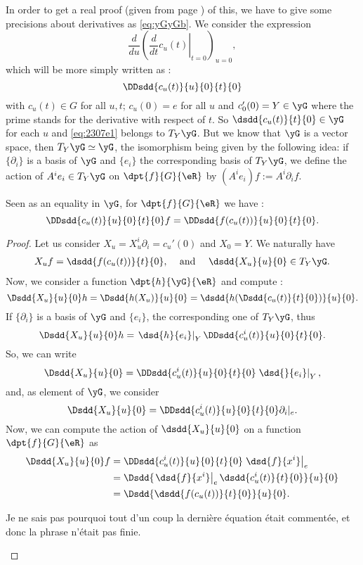 In order to get a real proof (given from page \pageref{pg_demXY_YX}) of this, we have to give some precisions about derivatives as \eqref{eq:yGyGb}. We consider the expression
\[
  \frac{d}{du}\left( \left.\frac{d}{dt} c_u(t)\right|_{t=0}\right)_{u=0},
\]
which will be more simply written as :
\begin{equation}\label{eq:2307e1}
\DDsdd{ c_u(t) }{u}{0}{t}{0}
\end{equation}
with $c_u(t)\in G$ for all $u,t$; $c_u(0)=e$ for all $u$ and $c_0'(0)=Y\in\yG$ where the prime stands for the derivative with respect of $t$. So $\dsdd{c_u(t)}{t}{0}\in\yG$ for each $u$ and \eqref{eq:2307e1} belongs to $T_Y\yG$. But we know that $\yG$ is a vector space, then $T_Y\yG\simeq\yG$, the isomorphism being given by the following idea: if $\{\partial_i\}$ is a basis of $\yG$ and $\{e_i\}$ the corresponding basis of $T_Y\yG$, we define the action of $A^ie_i\in T_Y\yG$ on $\dpt{f}{G}{\eR}$ by $(A^ie_i)f:=A^i\partial_if$.

\begin{lemma}
Seen as an equality in $\yG$, for $\dpt{f}{G}{\eR}$ we have :
\begin{equation}
   \DDsdd{c_u(t)}{u}{0}{t}{0}f=\DDsdd{f(c_u(t))}{u}{0}{t}{0}.
\end{equation}
\end{lemma}

\begin{proof}
Let us consider $X_u=X_u^i\partial_i=c_u'(0)$ and $X_0=Y$. We naturally have
\begin{align}
   X_uf&=\dsdd{f(c_u(t))}{t}{0},&\text{ and } &&\dsdd{X_u}{u}{0}\in T_Y\yG.
\end{align}
Now, we consider a function $\dpt{h}{\yG}{\eR}$ and compute :
\[
  \Dsdd{X_u}{u}{0}h=\Dsdd{h(X_u)}{u}{0}
                   =\dsdd{ h(\Dsdd{c_u(t)}{t}{0}) }{u}{0}.
\]		   
If $\{\partial_i\}$ is a basis of $\yG$ and $\{e_i\}$, the corresponding one of $T_Y\yG$, thus
\begin{equation}
                   \Dsdd{X_u}{u}{0}h=\left.\dsd{h}{e_i}\right|_Y\DDsdd{c^i_u(t)}{u}{0}{t}{0}.
\end{equation}
So, we can write
\[
   \Dsdd{X_u}{u}{0}=\DDsdd{c^i_u(t)}{u}{0}{t}{0}\left.\dsd{}{e_i}\right|_Y,
\]
and, as element of $\yG$, we consider
\[
  \Dsdd{X_u}{u}{0}=\DDsdd{ c^i_u(t) }{u}{0}{t}{0}\partial_i|_e.
\]
Now, we can compute the action of $\dsdd{X_u}{u}{0}$ on a function $\dpt{f}{G}{\eR}$ as
\begin{equation}
\begin{split}
\Dsdd{X_u}{u}{0}f&=\DDsdd{c^i_u(t)}{u}{0}{t}{0}\left.\dsd{f}{x^i}\right|_e\\
                 &=\Dsdd{ \left.\dsd{f}{x^i}\right|_e\dsdd{c^i_u(t)}{t}{0}  }{u}{0}\\
		 &=\Dsdd{ \dsdd{f(c_u(t))}{t}{0} }{u}{0}.
\end{split}
\end{equation}
\begin{probleme}
Je ne sais pas pourquoi tout d'un coup la dernière équation était commentée, et donc la phrase n'était pas finie.
\end{probleme}


\end{proof}


